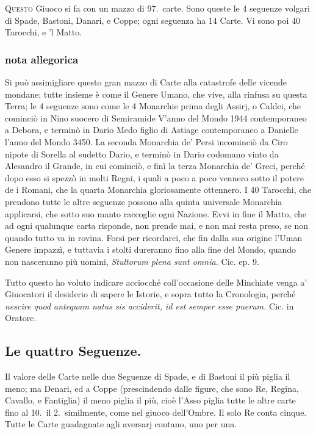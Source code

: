 \documentclass[11pt,a6paper]{article}
\begin{document}
\lettrine{Q}{uesto} Giuoco si fa con un
mazzo di 97.\ carte. Sono
queste le 4 seguenze volgari di Spade,
Bastoni, Danari, e Coppe;
ogni seguenza ha 14 Carte. Vi sono
poi 40 Tarocchi, e 'l Matto.

\subsubsection{nota allegorica}
{\footnotesize
Si può assimigliare questo gran mazzo di Carte
alla catastrofe delle vicende mondane; tutte
insieme è come il Genere Umano, che vive, alla rinfusa
su questa Terra; le 4 seguenze sono come le 4
Monarchie prima degli Assirj, o Caldei, che cominciò
in Nino suocero di Semiramide V'anno del
Mondo 1944 contemporaneo a Debora, e terminò in
Dario Medo figlio di Astiage contemporaneo a
Danielle l'anno del Mondo 3450. La seconda
Monarchia de' Persi incominciò da Ciro nipote di Sorella
al sudetto Dario, e terminò in Dario codomano
vinto da Alesandro il Grande, in cui cominciò, e
finì la terza Monarchia de' Greci, perché dopo esso
si spezzò in molti Regni, i quali a poco a poco
vennero sotto il potere de i Romani, che la quarta
Monarchia gloriosamente ottennero. I 40 Tarocchi,
che prendono tutte le altre seguenze possono alla
quinta universale Monarchia applicarsi, che sotto
suo manto raccoglie ogni Nazione. Evvi in fine il
Matto, che ad ogni qualunque carta risponde, non
prende mai, e non mai resta preso, se non quando
tutto va in rovina. Forsi per ricordarci, che fin
dalla sua origine l'Uman Genere impazzì, e
tuttavia i stolti dureranno fino alla fine del Mondo,
quando non nasceranno più uomini, \textit{Stultorum
plena sunt omnia.} Cic. ep. 9.

Tutto questo ho voluto indicare acciocché
coll'occasione delle Minchiate
venga a' Giuocatori il
desiderio di sapere le Istorie, e sopra
tutto la Cronologia, perché \textit{nescire quod
antequam natus sis acciderit,
id est semper esse puerum.} Cic. in
Oratore.
}
\subsection{Le quattro Seguenze.}

Il valore delle Carte nelle due Seguenze
di Spade, e di Bastoni il più piglia il
meno; ma Denari, ed a Coppe (prescindendo
dalle figure, che sono Re, Regina,
Cavallo, e Fantiglia) il meno piglia il
più, cioè
l'Asso piglia tutte le altre carte fino
al 10.~il 2.~similmente, come nel giuoco
dell'Ombre. Il solo Re conta cinque.
Tutte le Carte guadagnate agli aversarj contano,
uno per una.
\end{document}
